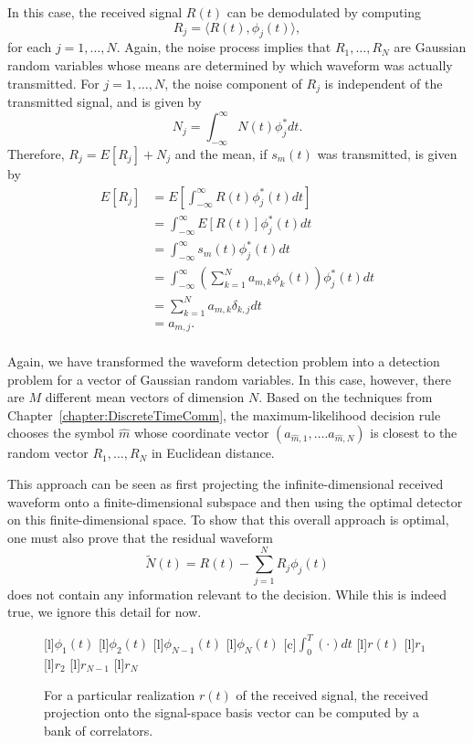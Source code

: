 In this case, the received signal $R(t)$ can be demodulated by computing
\[ R_j = \langle R(t), \phi_j (t) \rangle, \]
for each $j=1,\ldots,N$.
Again, the noise process implies that $R_1 , \ldots, R_N$ are Gaussian random variables whose means are determined by which waveform was actually transmitted.
For $j=1,\ldots,N$, the noise component of $R_j$ is independent of the transmitted signal, and is given by
\[ N_j = \int_{-\infty}^{\infty} N(t) \phi_j^* dt. \]
Therefore, $R_j = E[R_j] + N_j$ and the mean, if $s_m (t)$ was transmitted, is given by
\begin{align*}
E \left[R_j \right]
&= E \left[ \int_{-\infty}^{\infty} R(t) \phi_j^* (t) dt \right] \\
&= \int_{-\infty}^{\infty} E \left[ R(t) \right] \phi_j^* (t) dt \\
&= \int_{-\infty}^{\infty} s_m (t) \phi_j^* (t) dt \\
&= \int_{-\infty}^{\infty} \left( \sum_{k=1}^N a_{m,k} \phi_k (t) \right) \phi_j^* (t) dt \\
&= \sum_{k=1}^N a_{m,k} \delta_{k,j} dt \\
&= a_{m,j}. \\
\end{align*}

Again, we have transformed the waveform detection problem into a detection problem for a vector of Gaussian random variables.
In this case, however, there are $M$ different mean vectors of dimension $N$.
Based on the techniques from Chapter~\ref{chapter:DiscreteTimeComm}, the maximum-likelihood decision rule chooses the symbol $\hat{m}$ whose coordinate vector $(a_{\hat{m},1},\ldots. a_{\hat{m},N})$ is closest to the random vector $R_1,\ldots,R_N$ in Euclidean distance.

This approach can be seen as first projecting the infinite-dimensional received waveform onto a finite-dimensional subspace and then using the optimal detector on this finite-dimensional space.
To show that this overall approach is optimal, one must also prove that the residual waveform
\[ \tilde{N}(t) = R(t) - \sum_{j=1}^N R_j \phi_j (t) \]
does not contain any information relevant to the decision.
While this is indeed true, we ignore this detail for now.

\begin{figure}
\begin{center}
\begin{psfrags}
[l]{$\phi_1(t)$}
[l]{$\phi_2(t)$}
[l]{$\phi_{N-1}(t)$}
[l]{$\phi_N(t)$}
[c]{$\int_{0}^T (\cdot) dt$}
[l]{$r(t)$}
[l]{$r_1$}
[l]{$r_2$}
[l]{$r_{N-1}$}
[l]{$r_N$}
\end{psfrags}
\end{center}
\caption{For a particular realization $r(t)$ of the received signal, the received projection onto the signal-space basis vector can be computed by a bank of correlators.}
\end{figure}


